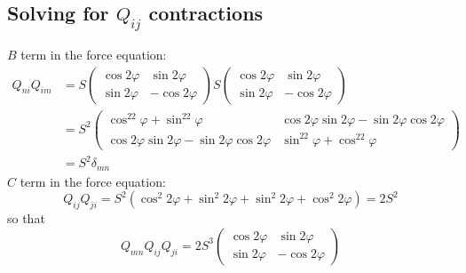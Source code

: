 \documentclass[reqno]{article}
\begin{document}
	\subsection{Solving for $Q_{ij}$ contractions}
	$B$ term in the force equation:
	\begin{equation}
	\begin{split}
		Q_{ni}Q_{im} &= S
		\begin{pmatrix}
			\cos2\varphi & \sin2\varphi \\
			\sin2\varphi & -\cos2\varphi
		\end{pmatrix}
		S
		\begin{pmatrix}
			\cos2\varphi & \sin2\varphi \\
			\sin2\varphi & -\cos2\varphi
		\end{pmatrix} \\
		&= S^2
		\begin{pmatrix}
			\cos^22\varphi + \sin^22\varphi & \cos2\varphi\sin2\varphi - \sin2\varphi\cos2\varphi \\
			\cos2\varphi\sin2\varphi - \sin2\varphi\cos2\varphi & \sin^22\varphi + \cos^22\varphi
		\end{pmatrix}\\
		&= S^2\delta_{mn}
	\end{split}
	\end{equation}
	$C$ term in the force equation:
	\begin{equation}
		Q_{ij}Q_{ji} = S^2\left( \cos^2 2\varphi + \sin^2 2\varphi + \sin^2 2\varphi + \cos^2 2\varphi \right) = 2S^2
	\end{equation}
	so that
	\begin{equation}
		Q_{mn}Q_{ij}Q_{ji} = 2S^3
		\begin{pmatrix}
			\cos2\varphi & \sin2\varphi \\
			\sin2\varphi & -\cos2\varphi
		\end{pmatrix}
	\end{equation}
	
\end{document}
